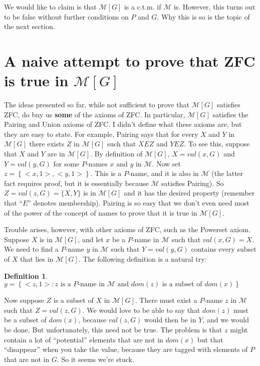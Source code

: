 \documentclass[10pt]{article}
\newcommand\axiom[1]{\textmd{#1}}
\theoremstyle{definition}
\newtheorem*{defn}{Definition}
\begin{document}
We would like to claim is that $\mathcal{M}[G]$ is a c.t.m. if $\mathcal{M}$ is. However, this turns out to be false without further conditions on $P$ and $G$. Why this is so is the topic of the next section.


\section{A naive attempt to prove that \axiom{ZFC} is true in $\mathcal{M}[G]$}

The ideas presented so far, while not sufficient to prove that $\mathcal{M}[G]$ satisfies \axiom{ZFC}, do buy us \textbf{some} of the axioms of \axiom{ZFC}. In particular, $\mathcal{M}[G]$ satisfies the Pairing and Union axioms of \axiom{ZFC}. I didn't define what these axioms are, but they are easy to state. For example, Pairing says that for every $X$ and $Y$ in $\mathcal{M}[G]$ there exists $Z$ in $\mathcal{M}[G]$ such that $X E Z$ and $Y E Z$. To see this, suppose that $X$ and $Y$ are in $\mathcal{M}[G]$. By definition of $\mathcal{M}[G]$, $X = val(x,G)$ and $Y = val(y,G)$ for some $P$-names $x$ and $y$ in $\mathcal M$. Now set $z = \left\{<x,1>, <y,1>\right\}$. This is a $P$-name, and it is also in $\mathcal{M}$ (the latter fact requires proof, but it is essentially because $\mathcal{M}$ satisfies Pairing). So $Z = val(z,G) = \{X,Y\}$ is in $\mathcal{M}[G]$ and it has the desired property (remember that ``$E$'' denotes membership). Pairing is so easy that we don't even need most of the power of the concept of names to prove that it is true in $\mathcal{M}[G]$.

Trouble arises, however, with other axioms of \axiom{ZFC}, such as the Powerset axiom. Suppose $X$ is in $\mathcal{M}[G]$, and let $x$ be a $P$-name in $\mathcal{M}$ such that $val(x,G) = X$. We need to find a $P$-name $y$ in $\mathcal{M}$ such that $Y = val(y,G)$ contains every subset of $X$ that lies in $\mathcal{M}[G]$. The following definition is a natural try:

\begin{defn}
$y = \left\{<z,1> : z\text{ is a }P\text{-name in }\mathcal{M}\text{ and }dom(z)\text{ is a subset of }dom(x)\right\}$
\end{defn}

Now suppose $Z$ is a subset of $X$ in $\mathcal{M}[G]$. There must exist a $P$-name $z$ in $\mathcal M$ such that $Z = val(z,G)$. We would love to be able to say that $dom(z)$ must be a subset of $dom(x)$, because $val(z,G)$ would then be in $Y$, and we would be done. But unfortunately, this need not be true. The problem is that $z$ might contain a lot of ``potential'' elements that are not in $dom(x)$ but that ``disappear'' when you take the value, because they are tagged with elements of $P$ that are not in $G$. So it seems we're stuck.
\end{document}
